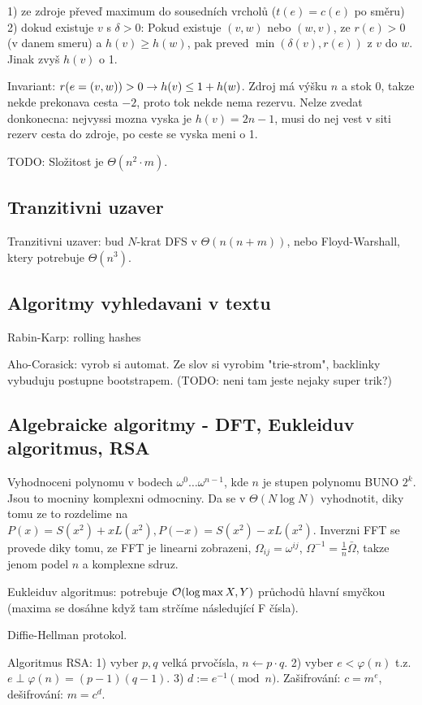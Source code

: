 1) ze zdroje převeď maximum do sousedních vrcholů ($t(e)=c(e)$ po směru)
2) dokud existuje $v$ s $\delta>0$:
	Pokud existuje $(v,w)$ nebo $(w,v)$, ze $r(e)>0$ (v danem smeru)
	a $h(v)\geq h(w)$, pak preved $\min(\delta(v), r(e))$ z $v$ do $w$.
	Jinak zvyš $h(v)$ o 1.

Invariant: $r(e=(v,w))>0\rightarrow h(v)\leq 1+h(w)$.
Zdroj má výšku $n$ a stok $0$, takze nekde prekonava cesta $-2$, proto tok nekde
nema rezervu.
Nelze zvedat donkonecna: nejvyssi mozna vyska je $h(v)=2n-1$, musi do nej vest v
siti rezerv cesta do zdroje, po ceste se vyska meni o 1.

TODO: Složitost je $\Theta(n^2\cdot m)$.

\subsection{Tranzitivni uzaver}
Tranzitivni uzaver: bud $N$-krat DFS v $\Theta(n(n+m))$, nebo Floyd-Warshall,
ktery potrebuje $\Theta(n^3)$.

\subsection{Algoritmy vyhledavani v textu}
Rabin-Karp: rolling hashes

Aho-Corasick: vyrob si automat. Ze slov si vyrobim "trie-strom", backlinky
vybuduju postupne bootstrapem. (TODO: neni tam jeste nejaky super trik?)

\subsection{Algebraicke algoritmy - DFT, Eukleiduv algoritmus, RSA}

Vyhodnoceni polynomu v bodech $\omega^0\ldots\omega^{n-1}$, kde
$n$ je stupen polynomu BUNO $2^k$. Jsou to mocniny komplexni odmocniny.
Da se v $\Theta(N\log N)$ vyhodnotit, diky tomu ze to rozdelime na
$P(x)=S(x^2)+xL(x^2), P(-x)=S(x^2)-xL(x^2)$. Inverzni FFT se provede
diky tomu, ze FFT je linearni zobrazeni, $\Omega_{ij}=\omega^{ij}$,
$\Omega^{-1}=\frac{1}{n}\bar{\Omega}$, takze jenom podel $n$ a komplexne sdruz.

Eukleiduv algoritmus: potrebuje $\mathcal{O}(\log \max{X,Y})$ průchodů hlavní smyčkou
(maxima se dosáhne když tam strčíme následující F čísla).

Diffie-Hellman protokol.

Algoritmus RSA: 1) vyber $p,q$ velká prvočísla, $n\gets p\cdot q$.
2) vyber $e<\varphi(n)$ t.z. $e\perp \varphi(n)=(p-1)(q-1)$.
3) $d:=e^{-1}\pmod n$.
Zašifrování: $c=m^e$, dešifrování: $m=c^d$.
